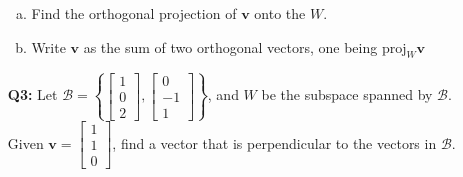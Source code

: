 \documentclass[a4paper,11pt,reqno]{amsart}
\numberwithin{equation}{section}
\begin{document}
\begin{enumerate}
    \begin{enumerate}[a)]
        \item Find the orthogonal projection of  \(\mathbf{v}\) onto the \(W\).
        \item Write \(\mathbf{v}\) as the sum of two orthogonal vectors, one being \(\text{proj}_{W} \mathbf{v}\)
    \end{enumerate}
    \vspace{0.3cm}
    
    \item[\textbf{Q3:}] Let \(\mathcal{B} =\left\{\begin{bmatrix} 1 \\ 0 \\ 2 \end{bmatrix}, \begin{bmatrix} 0 \\ -1 \\ 1 \end{bmatrix} \right\}\), and \(W\) be the subspace spanned by \(\mathcal{B}\).
    Given \(\mathbf{v} = \begin{bmatrix} 1 \\ 1 \\ 0 \end{bmatrix}\), find a vector that is perpendicular to the vectors in \(\mathcal{B}\).
\end{enumerate}





\end{document}
